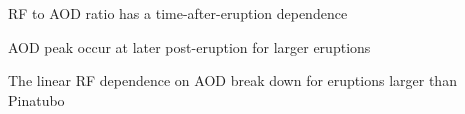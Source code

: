 \documentclass[draft]{agujournal2019}
\begin{document}

\begin{keypoints}
  \item RF to AOD ratio has a time-after-eruption dependence
  \item AOD peak occur at later post-eruption for larger eruptions
  \item The linear RF dependence on AOD break down for eruptions larger than Pinatubo
\end{keypoints}

%
%

%
%

\end{document}
